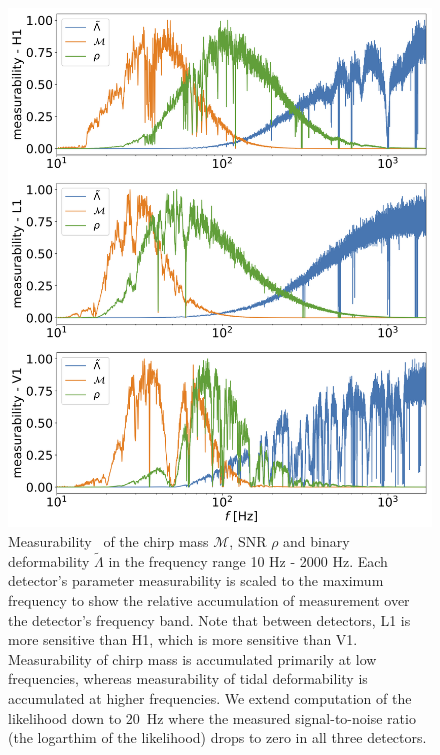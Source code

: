 \begin{figure}[t]
  \includegraphics[width=14cm]{Figures/common-radius/measurability_plots.png}
  \caption{Measurability~\cite{Damour:2012yf} of the chirp mass $\mathcal{M}$, SNR $\rho$ and binary deformability $\tilde{\Lambda}$ in the frequency range 10 Hz - 2000 Hz. Each detector's parameter measurability is scaled to the maximum frequency to show the relative accumulation of measurement over the detector's frequency band. Note that between detectors, L1 is more sensitive than H1, which is more sensitive than V1. Measurability of chirp mass is accumulated primarily at low frequencies, whereas measurability of tidal deformability is accumulated at higher frequencies. We extend computation of the likelihood down to $20$~Hz where the measured signal-to-noise ratio (the logarthim of the likelihood) drops to zero in all three detectors. 
  \label{fig:measurability}}
\end{figure}

